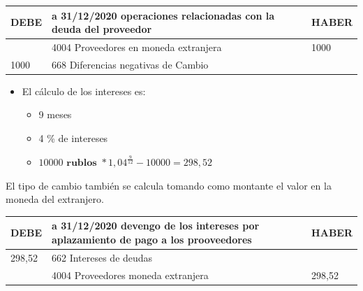 \documentclass[a4paper,12pt]{article}
\newcommand{\fec}{31/12/}
\begin{document}
\begin{table}[H]
    \centering
    \begin{tabular}{|p{3cm}|p{6cm}|p{3cm}|}
    \hline
    \textbf{DEBE} & \textbf{a \fec2020 operaciones relacionadas con la deuda del proveedor} & \textbf{HABER} \\
    \hline
    & 4004 Proveedores en moneda extranjera& 1000\\
    \hline
    1000& 668 Diferencias negativas de Cambio& \\
    \hline
    \end{tabular}
\end{table}

\begin{itemize}
    \item El cálculo de los intereses es:
    \begin{itemize}
        \item 9 meses
        \item 4 \% de intereses
        \item $10000 \textbf{ rublos } * 1,04^{\frac{9}{12}} - 10000 = 298,52$
    \end{itemize}
\end{itemize}
\begin{tcolorbox}[colback=red!5!white,colframe=yellow!75!black, title={Nota}]
    El tipo de cambio también se calcula tomando como montante el valor en la moneda del extranjero.
\end{tcolorbox}

\begin{table}[H]
    \centering
    \begin{tabular}{|p{3cm}|p{6cm}|p{3cm}|}
    \hline
    \textbf{DEBE} & \textbf{a \fec2020 devengo de los intereses por aplazamiento de pago a los prooveedores} & \textbf{HABER} \\
    \hline
    298,52& 662 Intereses de deudas& \\
    \hline
    & 4004 Proveedores moneda extranjera& 298,52\\
    \hline
    \end{tabular}
\end{table}
\end{document}
